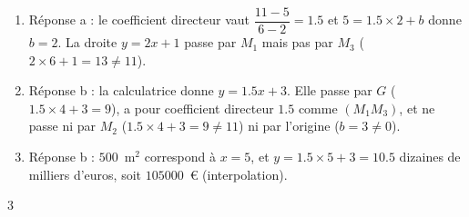 {\begin{enumerate}
\item Réponse a : le coefficient directeur vaut $\dfrac{11-5}{6-2}=\num{1,5}$ et $5=\num{1,5}\times2+b$ donne $b=2$. La droite $y=2x+1$ passe par $M_1$ mais pas par $M_3$ ($2\times6+1=13\neq11$).
\item Réponse b : la calculatrice donne $y=\num{1,5}x+3$. Elle passe par $G$ ($\num{1,5}\times4+3=9$), a pour coefficient directeur $\num{1,5}$ comme $(M_1M_3)$, et ne passe ni par $M_2$ ($\num{1,5}\times4+3=9\neq11$) ni par l'origine ($b=3\neq0$).
\item Réponse b : $500$~m$^2$ correspond à $x=5$, et $y=\num{1,5}\times5+3=\num{10,5}$ dizaines de milliers d'euros, soit $\num{105000}$~€ (interpolation).
\end{enumerate}
}{3}

